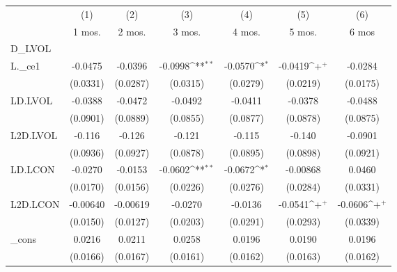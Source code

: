 {
\def\sym#1{\ifmmode^{#1}\else\(^{#1}\)\fi}
\begin{tabular}{l*{6}{c}}
\hline\hline
          &\multicolumn{1}{c}{(1)}&\multicolumn{1}{c}{(2)}&\multicolumn{1}{c}{(3)}&\multicolumn{1}{c}{(4)}&\multicolumn{1}{c}{(5)}&\multicolumn{1}{c}{(6)}\\
          &\multicolumn{1}{c}{1 mos.}&\multicolumn{1}{c}{2 mos.}&\multicolumn{1}{c}{3 mos.}&\multicolumn{1}{c}{4 mos.}&\multicolumn{1}{c}{5 mos.}&\multicolumn{1}{c}{6 mos}\\
\hline
D\_LVOL    &                  &                  &                  &                  &                  &                  \\
L.\_ce1    &  -0.0475         &  -0.0396         &  -0.0998\sym{**} &  -0.0570\sym{*}  &  -0.0419\sym{+}  &  -0.0284         \\
          & (0.0331)         & (0.0287)         & (0.0315)         & (0.0279)         & (0.0219)         & (0.0175)         \\
LD.LVOL   &  -0.0388         &  -0.0472         &  -0.0492         &  -0.0411         &  -0.0378         &  -0.0488         \\
          & (0.0901)         & (0.0889)         & (0.0855)         & (0.0877)         & (0.0878)         & (0.0875)         \\
L2D.LVOL  &   -0.116         &   -0.126         &   -0.121         &   -0.115         &   -0.140         &  -0.0901         \\
          & (0.0936)         & (0.0927)         & (0.0878)         & (0.0895)         & (0.0898)         & (0.0921)         \\
LD.LCON   &  -0.0270         &  -0.0153         &  -0.0602\sym{**} &  -0.0672\sym{*}  & -0.00868         &   0.0460         \\
          & (0.0170)         & (0.0156)         & (0.0226)         & (0.0276)         & (0.0284)         & (0.0331)         \\
L2D.LCON  & -0.00640         & -0.00619         &  -0.0270         &  -0.0136         &  -0.0541\sym{+}  &  -0.0606\sym{+}  \\
          & (0.0150)         & (0.0127)         & (0.0203)         & (0.0291)         & (0.0293)         & (0.0339)         \\
\_cons    &   0.0216         &   0.0211         &   0.0258         &   0.0196         &   0.0190         &   0.0196         \\
          & (0.0166)         & (0.0167)         & (0.0161)         & (0.0162)         & (0.0163)         & (0.0162)         \\

\end{tabular}}
